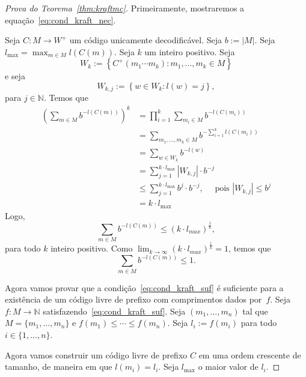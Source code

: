 \begin{proof}[Prova do Teorema~\ref{thm:kraftmc}]
    Primeiramente, mostraremos a equação~\eqref{eq:cond_kraft_nec}.
    
    Seja $C:M\to W^+$ um código unicamente decodificável. Seja $b :=
    |M|$. Seja $l_{\max} = \max_{m\in M} l(C(m))$. Seja $k$ um inteiro
    positivo. Seja
    \begin{equation*}
      W_k := \left\{ C^+(m_1\dotsm m_k):
      m_1,..., m_k \in M\right\}
    \end{equation*}
    e seja
    \begin{equation*}
      W_{k,j} := \left\{
      w \in W_k: l(w) = j
      \right\},
    \end{equation*}
    para $j\in \mathbb{N}$. Temos que
    \begin{align*}
      \left(\sum_{m\in M} b^{-l(C(m))}\right)^k
      &= \prod_{i=1}^k \sum_{m_i \in M} b^{-l(C(m_i))} \\
      &= \sum_{m_1,..., m_k \in M} b^{-\sum_{i=1}^{k} l(C(m_i))} \\
      &= \sum_{w\in W_k} b^{-l(w)}\\
      &= \sum_{j=1}^{k \cdot l_{\max}} |W_{k,j}| \cdot b^{-j}\\
      &\leq \sum_{j=1}^{k \cdot l_{\max}} b^j \cdot b^{-j},
      \quad\text{ pois }|W_{k,j}|\leq b^j\\
      & = k \cdot l_{\max}
    \end{align*}
Logo,
\begin{equation*}
\sum_{m\in M} b^{-l(C(m))} \leq (k \cdot l_{max})^ \frac{1}{k},
\end{equation*}
para todo $k$ inteiro positivo. Como $\lim_{k\to\infty} (k \cdot l_{max})^ \frac{1}{k} = 1$, temos que
\begin{equation*}
\sum_{m\in M} b^{-l(C(m))} \leq 1.
\end{equation*}

Agora vamos provar que a condição~\eqref{eq:cond_kraft_suf} é
suficiente para a existência de um código livre de prefixo com
comprimentos dados por~$f$. Seja $f: M\to\mathbb{N}$
satisfazendo~\eqref{eq:cond_kraft_suf}. Seja $(m_1,\dotsc, m_n)$ tal
que $M = \{m_1,\dotsc, m_n\}$ e $f(m_1) \leq \dotsm \leq f(m_n)$. Seja
$l_i := f(m_i)$ para todo $i\in\{1,\dotsc,n\}$.

Agora vamos construir um código livre de prefixo $C$ em uma ordem
crescente de tamanho, de maneira em que $l(m_i) = l_i$. Seja $l_{\max}$
o maior valor de $l_i$.


\end{proof}
